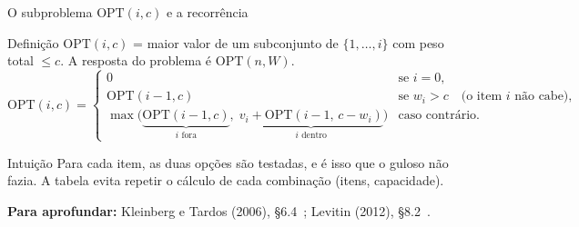 \documentclass[aspectratio=169,xcolor=table]{beamer}
\newcommand{\fonte}[1]{%
  \vfill
  {\tiny\color{gray!55!black}\textbf{Para aprofundar:} #1\par}%
}
\begin{document}
\begin{frame}{O subproblema $\mathrm{OPT}(i,c)$ e a recorrência}
  \begin{block}{Definição}
    \scriptsize $\mathrm{OPT}(i,c)$ = maior valor de um subconjunto de $\{1,\dots,i\}$ com peso
    total $\le c$. A resposta do problema é $\mathrm{OPT}(n,W)$.
    \[
      \mathrm{OPT}(i,c) =
      \begin{cases}
        0 & \text{se } i = 0,\\[2pt]
        \mathrm{OPT}(i-1,c) & \text{se } w_i > c \quad\text{(o item $i$ não cabe)},\\[2pt]
        \max\bigl(\underbrace{\mathrm{OPT}(i-1,c)}_{i\text{ fora}},\;
                  \underbrace{v_i + \mathrm{OPT}(i-1,\,c-w_i)}_{i\text{ dentro}}\bigr)
          & \text{caso contrário.}
      \end{cases}
    \]
  \end{block}
  \begin{exampleblock}{Intuição}
    \scriptsize Para cada item, as duas opções são testadas, e é isso que o guloso não
    fazia. A tabela evita repetir o cálculo de cada combinação (itens, capacidade).
  \end{exampleblock}
  \fonte{Kleinberg e Tardos (2006), \S 6.4~\cite{kleinberg2006algorithm};
    Levitin (2012), \S 8.2~\cite{levitin2012introduction}.}
\end{frame}
\end{document}
